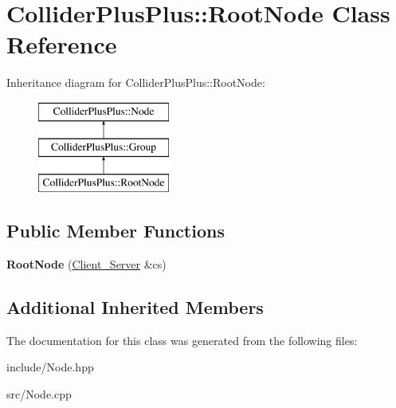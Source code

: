 \hypertarget{classColliderPlusPlus_1_1RootNode}{\section{Collider\-Plus\-Plus\-:\-:Root\-Node Class Reference}
\label{classColliderPlusPlus_1_1RootNode}
}
Inheritance diagram for Collider\-Plus\-Plus\-:\-:Root\-Node\-:\begin{figure}[H]
\begin{center}
\leavevmode
\includegraphics[height=3.000000cm]{classColliderPlusPlus_1_1RootNode}
\end{center}
\end{figure}
\subsection*{Public Member Functions}
\begin{DoxyCompactItemize}
\item 
\hypertarget{classColliderPlusPlus_1_1RootNode_ab1a4476f355e19055fa056802e7ffee9}{{\bfseries Root\-Node} (\hyperlink{classColliderPlusPlus_1_1Client__Server}{Client\-\_\-\-Server} \&cs)}\label{classColliderPlusPlus_1_1RootNode_ab1a4476f355e19055fa056802e7ffee9}

\end{DoxyCompactItemize}
\subsection*{Additional Inherited Members}


The documentation for this class was generated from the following files\-:\begin{DoxyCompactItemize}
\item 
include/Node.\-hpp\item 
src/Node.\-cpp\end{DoxyCompactItemize}
